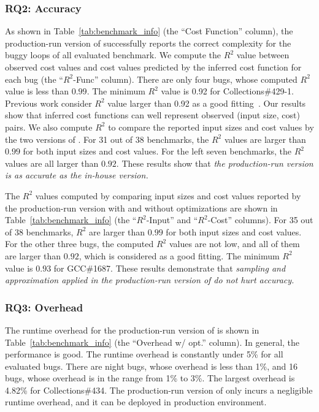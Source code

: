 \subsubsection{RQ2: Accuracy}
As shown in Table~\ref{tab:benchmark_info} (the ``Cost Function'' column),
the production-run version of \Tool successfully 
reports the correct complexity for the buggy loops of 
all evaluated benchmark. 
We compute the $R^2$ value between observed cost values and 
cost values predicted by the inferred cost function for each bug 
(the ``$R^2$-Func'' column).  
There are only four bugs, whose computed $R^2$ value is less than $0.99$.
The minimum $R^2$ value is 0.92 for Collections\#429-1. 
Previous work consider $R^2$ value larger than 0.92 
as a good fitting~\cite{rsquare-value}.
Our results show that inferred cost functions can well represent 
observed (input size, cost) pairs. 
We also compute $R^2$ to compare the reported input sizes 
and cost values by the two versions of \Tool. 
For 31 out of 38 benchmarks, 
the $R^2$ values are larger than $0.99$ for both input sizes and cost values. 
For the left seven benchmarks, the $R^2$ values are all larger than $0.92$. 
These results show that \emph{the production-run version is 
as accurate as the in-house version. 
}

The $R^2$ values computed by comparing input sizes and cost values 
reported by the production-run version with and without optimizations are shown in 
Table~\ref{tab:benchmark_info} 
(the ``$R^2$-Input'' and ``$R^2$-Cost'' columns).
For 35 out of 38 benchmarks, $R^2$ are larger than $0.99$ for 
both input sizes and cost values. 
For the other three bugs, the computed $R^2$ values are not low, 
and all of them are larger than $0.92$, which is considered as a good fitting. 
The minimum $R^2$ value is $0.93$ for GCC\#1687.
These results demonstrate that \emph{sampling and approximation 
applied in the production-run version of \Tool do not hurt accuracy. 
}


\subsubsection{RQ3: Overhead}

The runtime overhead for the production-run version of \Tool is 
shown in Table~\ref{tab:benchmark_info} (the ``Overhead w/ opt.'' column). 
In general, the performance is good. 
The runtime overhead is constantly 
under 5\% for all evaluated bugs. 
There are night bugs, whose overhead is less than 1\%, 
and 16 bugs, whose overhead is in the range from 1\% to 3\%.  
The largest overhead is 4.82\% for Collections\#434. 
The production-run version of \Tool only incurs a negligible runtime overhead, 
and it can be deployed in production environment.  

